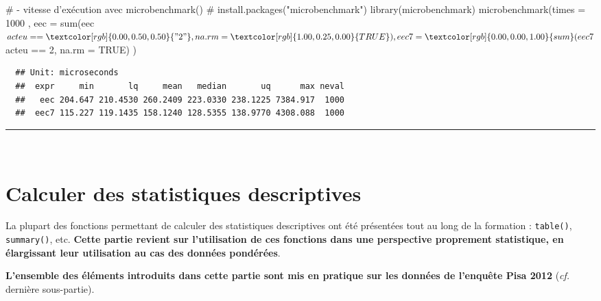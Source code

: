 \documentclass[12pt,twosided, notitlepage]{book}
\newenvironment{Shaded}{}{}
\newcommand{\KeywordTok}[1]{\textcolor[rgb]{0.00,0.00,1.00}{#1}}
\newcommand{\DataTypeTok}[1]{#1}
\newcommand{\DecValTok}[1]{#1}
\newcommand{\StringTok}[1]{\textcolor[rgb]{0.00,0.50,0.50}{#1}}
\newcommand{\CommentTok}[1]{\textcolor[rgb]{0.00,0.50,0.00}{#1}}
\newcommand{\OtherTok}[1]{\textcolor[rgb]{1.00,0.25,0.00}{#1}}
\newcommand{\OperatorTok}[1]{#1}
\newcommand{\NormalTok}[1]{#1}
\renewenvironment{Shaded}{\begin{snugshade}}{\end{snugshade}}
\begin{document}
\begin{enumerate}
\begin{enumerate}
\begin{Shaded}
\begin{Highlighting}[]
\CommentTok{# - vitesse d'exécution avec microbenchmark()}
\CommentTok{# install.packages("microbenchmark")}
\KeywordTok{library}\NormalTok{(microbenchmark)}
\KeywordTok{microbenchmark}\NormalTok{(}\DataTypeTok{times =} \DecValTok{1000}
\NormalTok{  , }\DataTypeTok{eec =} \KeywordTok{sum}\NormalTok{(eec}\OperatorTok{$}\NormalTok{acteu }\OperatorTok{==}\StringTok{ "2"}\NormalTok{, }\DataTypeTok{na.rm =} \OtherTok{TRUE}\NormalTok{)}
\NormalTok{  , }\DataTypeTok{eec7 =} \KeywordTok{sum}\NormalTok{(eec7}\OperatorTok{$}\NormalTok{acteu }\OperatorTok{==}\StringTok{ }\DecValTok{2}\NormalTok{, }\DataTypeTok{na.rm =} \OtherTok{TRUE}\NormalTok{)}
\NormalTok{)}
\end{Highlighting}
\end{Shaded}

\begin{verbatim}
  ## Unit: microseconds
  ##  expr     min       lq     mean   median       uq      max neval
  ##   eec 204.647 210.4530 260.2409 223.0330 238.1225 7384.917  1000
  ##  eec7 115.227 119.1435 158.1240 128.5355 138.9770 4308.088  1000
\end{verbatim}

    \begin{center} \rule{0.5\linewidth}{\linethickness}\end{center}

    \bigskip  \fi 
  \end{enumerate}
\end{enumerate}

~

\section{Calculer des statistiques
descriptives}\label{calculer-des-statistiques-descriptives}

La plupart des fonctions permettant de calculer des statistiques
descriptives ont été présentées tout au long de la formation :
\texttt{table()}, \texttt{summary()}, etc. \textbf{Cette partie revient
sur l'utilisation de ces fonctions dans une perspective proprement
statistique, en élargissant leur utilisation au cas des données
pondérées}.

\textbf{L'ensemble des éléments introduits dans cette partie sont mis en
pratique sur les données de l'enquête Pisa 2012} (\emph{cf.} dernière
sous-partie).
\end{document}
